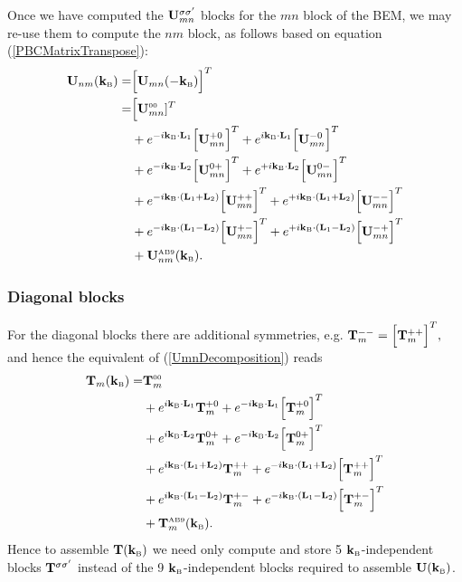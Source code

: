 Once we have computed the 
$\vb U_{mn}^{\sigma\sigma^\prime}$ blocks for the $mn$ block of 
the BEM, we may re-use them to compute the $nm$ block, as follows 
based on equation (\ref{PBCMatrixTranspose}):
\begin{align}
\vb U_{nm}(\KB) 
=  &\Big[\vb U_{mn}(-\KB)\Big]^T 
\\
=  &\Big[\vb U_{mn}\supt{00}]^T
\\
   & + e^{ -i \KB \cdot \vb L_1} \Big[\vb U_{mn}^{+0}\Big]^T
     + e^{  i \KB \cdot \vb L_1} \Big[\vb U_{mn}^{-0}\Big]^T
\nn
   & + e^{ -i \KB \cdot \vb L_2} \Big[\vb U_{mn}^{0+}\Big]^T
     + e^{ +i \KB \cdot \vb L_2} \Big[\vb U_{mn}^{0-}\Big]^T
\nn
   & + e^{ -i \KB \cdot (\vb L_1+\vb L_2)} \Big[\vb U_{mn}^{++}\Big]^T
     + e^{ +i \KB \cdot (\vb L_1+\vb L_2)} \Big[\vb U_{mn}^{--}\Big]^T
\nn
   & + e^{ -i \KB \cdot (\vb L_1-\vb L_2)} \Big[\vb U_{mn}^{+-}\Big]^T
     + e^{ +i \KB \cdot (\vb L_1-\vb L_2)} \Big[\vb U_{mn}^{-+}\Big]^T
\nn
   & + \vb U_{nm}\supt{AB9}(\KB).
\nonumber
\end{align}

\subsubsection*{Diagonal blocks}

For the diagonal blocks there are additional symmetries, e.g.
$ \vb T_{m}^{--} = \Big[\vb T_{m}^{++}\Big]^T, $
and hence the equivalent of (\ref{UmnDecomposition}) reads 
\begin{align}
\vb T_{m}(\KB)
 =   &\vb T_{m}\supt{00}
\label{TmDecomposition}\\
   & + e^{ i \KB \cdot \vb L_1} \vb T_{m}^{+0}
     + e^{-i \KB \cdot \vb L_1} \Big[\vb T_{m}^{+0}\Big]^T
\nn
   & + e^{ i \KB \cdot \vb L_2} \vb T_{m}^{0+}
     + e^{-i \KB \cdot \vb L_2} \Big[\vb T_{m}^{0+}\Big]^T
\nn
   & + e^{ i \KB \cdot (\vb L_1+\vb L_2)} \vb T_{m}^{++}
     + e^{-i \KB \cdot (\vb L_1+\vb L_2)} \Big[ \vb T_{m}^{++}\Big]^T
\nn
   & + e^{ i \KB \cdot (\vb L_1-\vb L_2)} \vb T_{m}^{+-}
     + e^{-i \KB \cdot (\vb L_1-\vb L_2)} \Big[ \vb T_{m}^{+-}\Big]^T
\nn
   & + \vb T_{m}\supt{AB9}(\KB).
\nonumber
\end{align}
Hence to assemble $\vb T(\KB)$ we need only compute and
store 5 $\KB$-independent blocks $\vb T^{\sigma \sigma^\prime}$
instead of the 9 $\KB$-independent blocks required to assemble
$\vb U(\KB)$.

